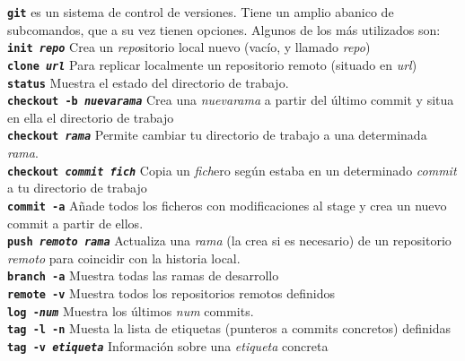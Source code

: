 \documentclass[10pt,landscape,a4paper]{article}
\newcommand{\bcode}[1]{\texttt{\textbf{#1}}}
\begin{document}
\begin{multicols}{3}
%

\bcode{git} es un sistema de control de versiones. Tiene un amplio abanico de subcomandos, que a su vez tienen opciones. Algunos de los más utilizados son:\\
  \bcode{init \emph{repo}} Crea un \emph{repo}sitorio local nuevo (vacío, y llamado \emph{repo})\\
  \bcode{clone \emph{url}} Para replicar localmente un repositorio remoto (situado en \emph{url})\\
  \bcode{status} Muestra el estado del directorio de trabajo.\\
  \bcode{checkout -b \emph{nuevarama}} Crea una \emph{nuevarama} a partir del último commit y situa en ella el directorio de trabajo\\
  \bcode{checkout \emph{rama}} Permite cambiar tu directorio de trabajo a una determinada \emph{rama}.\\
  \bcode{checkout \emph{commit} \emph{fich}} Copia un \emph{fich}ero según estaba en un determinado \emph{commit} a tu directorio de trabajo\\
  \bcode{commit -a} Añade todos los ficheros con modificaciones al stage y crea un nuevo commit a partir de ellos.\\
  \bcode{push \emph{remoto} \emph{rama}} Actualiza una \emph{rama} (la crea si es necesario) de un repositorio \emph{remoto} para coincidir con la historia local.\\
  \bcode{branch -a} Muestra todas las ramas de desarrollo\\
  \bcode{remote -v} Muestra todos los repositorios remotos definidos\\
  \bcode{log -\emph{num}} Muestra los últimos \emph{num} commits.\\
  \bcode{tag -l -n} Muesta la lista de etiquetas (punteros a commits concretos) definidas\\
  \bcode{tag -v \emph {etiqueta}} Información sobre una \emph{etiqueta} concreta\\


\end{multicols}
\end{document}
